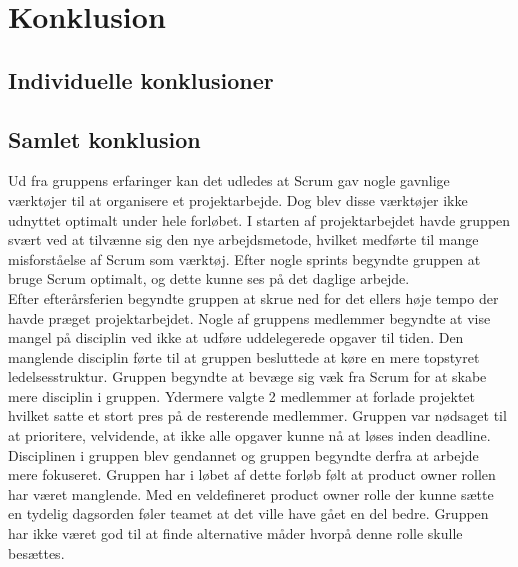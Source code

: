 \chapter{Konklusion}

\section{Individuelle konklusioner}
\section{Samlet konklusion}
Ud fra gruppens erfaringer kan det udledes at Scrum gav nogle gavnlige værktøjer til at organisere et projektarbejde. Dog blev disse værktøjer ikke udnyttet optimalt under hele forløbet. I starten af projektarbejdet havde gruppen svært ved at tilvænne sig den nye arbejdsmetode, hvilket medførte til mange misforståelse af Scrum som værktøj. Efter nogle sprints begyndte gruppen at bruge Scrum optimalt, og dette kunne ses på det daglige arbejde.
\\
Efter efterårsferien begyndte gruppen at skrue ned for det ellers høje tempo der havde præget projektarbejdet. Nogle af gruppens medlemmer begyndte at vise mangel på disciplin ved ikke at udføre uddelegerede opgaver til tiden. Den manglende disciplin førte til at gruppen besluttede at køre en mere topstyret ledelsesstruktur. Gruppen begyndte at bevæge sig væk fra Scrum for at skabe mere disciplin i gruppen. Ydermere valgte 2 medlemmer at forlade projektet hvilket satte et stort pres på de resterende medlemmer. Gruppen var nødsaget til at prioritere, velvidende, at ikke alle opgaver kunne nå at løses inden deadline. Disciplinen i gruppen blev gendannet og gruppen begyndte derfra at arbejde mere fokuseret. Gruppen har i løbet af dette forløb følt at product owner rollen har været manglende. Med en veldefineret product owner rolle der kunne sætte en tydelig dagsorden føler teamet at det ville have gået en del bedre. Gruppen har ikke været god til at finde alternative måder hvorpå denne rolle skulle besættes. 